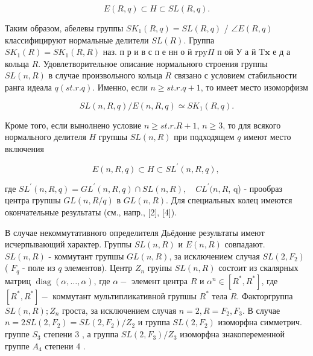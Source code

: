 \documentclass[10pt]{article}
\begin{document}
\[

E(R, q) \subset H \subset S L(R, q) .

\]



Таким образом, абелевы группы $S K_{1}(R, q)=S L(R, q)$ / $\angle E(R, q)$ классифицируют нормальные делители $S L(R)$. Группа $S K_{1}(R)=S K_{1}(R, R)$ наз. п р и в с п е нн о й $\mathrm{r} \mathrm{p} \mathrm{y} \Pi$ п ой У а й $\mathrm{T} \mathbf{x}$ е д а кольца $R$. Удовлетворительное описание нормального строения группы $S L(n, R)$ в случае произвольного кольца $R$ связано с условием стабильности ранга идеала $q(s t . r . q)$. Именно, если $n \geqslant s t . r . q+1$, то имеет место изоморфизм



\[

S L(n, R, q) / E(n, R, q) \simeq S K_{1}(R, q) .

\]



Кроме того, если вынолнено условие $n \geqslant s t . r . R+1$, $n \geqslant 3$, то для всякого нормального делителя $H$ групшы $S L(n, R)$ при подходящем $q$ имеют место включения



\[

E(n, R, q) \subset H \subset S L^{\prime}(n, R, q) \text {, }

\]



где $S L^{\prime}(n, R, q)=G L^{\prime}(n, R, q) \cap S L(n, R), \quad C L^{\prime}(n, R$, q) - прообраз центра групшы $G L(n, R / q)$ в $G L(n, R)$. Для специальных колец имеются окончательные результаты (см., напр., [2], [4]).



В случае некоммутативного определителя Дьёдонне результаты имеют исчерпывающий характер. Группы $S L(n, R)$ и $E(n, R)$ совпадают. $S L(n, R)$ - коммутант групшы $G L(n, R)$, за исключением случая $S L\left(2, F_{2}\right)$ ( $F_{q}$ - поле из $q$ элементов). Центр $Z_{n}$ груіпы $S L(n, R)$ состоит из скалярных матриц $\operatorname{diag}(\alpha, \ldots, \alpha)$, где $\alpha-$ элемент центра $R$ и $\alpha^{n} \in\left[R^{*}, R^{*}\right]$, где $\left[R^{*}, R^{*}\right]-$ коммутант мультипликативноӥ групшы $R^{*}$ тела $R$. Факторгруппа $S L(n, R) ; Z_{n}$ гроста, за исключением случая $n=2, R=F_{2}, F_{3}$. В случае $n=2 S L\left(2, F_{2}\right)=S L\left(2, F_{2}\right) / Z_{2}$ и группа $S L\left(2, F_{2}\right)$ изоморфна симметрич. группе $S_{3}$ степени 3 , а группа $S L\left(2, F_{3}\right) / Z_{3}$ изоморфна знакопеременной группе $A_{4}$ степени 4 .
\end{document}

